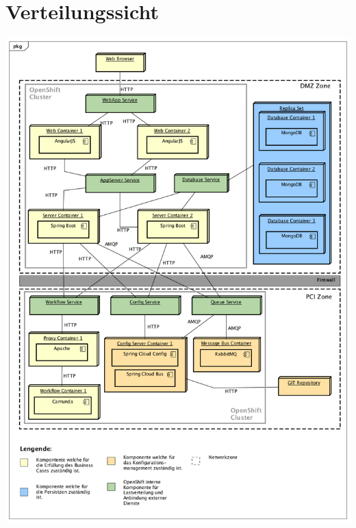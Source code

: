 \graphicspath{{./images/}}

\chapter{Verteilungssicht}

\begin{center}
	\includegraphics[scale=0.43]{OpenShiftDeployment.png}
\end{center}
